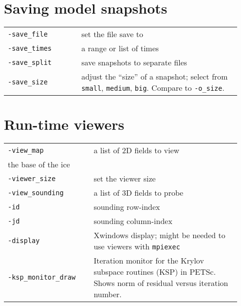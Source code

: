 \documentclass[landscape]{article}
\begin{document}
\begin{textblock}{15}

\section{Saving model snapshots}
\label{sec:snapshots}
\begin{tabular}{@{}p{0.3\linewidth}p{0.65\linewidth}@{}}
\texttt{-save_file} & set the file save to\\
\texttt{-save_times} & a range or list of times\\
\texttt{-save_split} & save snapshots to separate files\\
\texttt{-save_size} & adjust the ``size'' of a snapshot; select from
\texttt{small}, \texttt{medium}, \texttt{big}. Compare to \texttt{-o_size}.
\end{tabular}

\section{Run-time viewers}
\label{sec:run-time-viewers}

\begin{tabular}{@{}p{0.35\linewidth}p{0.6\linewidth}@{}}
\texttt{-view_map} & a list of 2D fields to view\\
the base of the ice\\
\texttt{-viewer_size} & set the viewer size \\
\texttt{-view_sounding} & a list of 3D fields to probe\\
\texttt{-id} & sounding row-index\\
\texttt{-jd} & sounding column-index\\
\texttt{-display} & Xwindows display; might be needed to use viewers with \texttt{mpiexec}\\
\texttt{-ksp_monitor_draw} & Iteration monitor for the Krylov subspace routines (KSP) 
in PETSc. Shows norm of residual versus iteration number.
\end{tabular}


\end{textblock}
\end{document}
